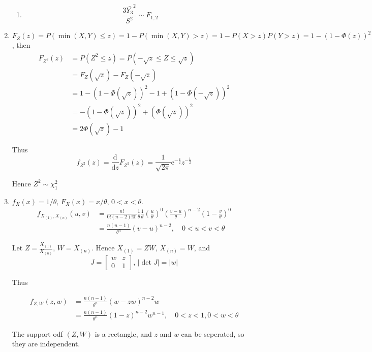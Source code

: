 \documentclass{article}
\begin{document}
\begin{enumerate}[leftmargin = 0 em, label = \arabic*., font = \bfseries]
\begin{enumerate}
		\item 
		\[\frac{3 \bar{Y_3}^2}{S^2} \sim F_{1,2}\]
	\end{enumerate}
	
	\item 
	$F_Z (z) = P(\min (X,Y) \leq z) = 1 - P(\min (X,Y) > z) = 1 - P(X>z)P(Y>z) = 1 - (1 - \Phi(z))^2$, then
	\begin{align*}
	F_{Z^2} (z) &= P(Z^2 \leq z)  = P(- \sqrt{z} \leq Z \leq \sqrt{z})\\
	& = F_{Z} (\sqrt{z}) - F_Z (-\sqrt{z})\\
	& = 1-(1 - \Phi(\sqrt{z}))^2 -1 + (1 - \Phi(-\sqrt{z}))^2\\
	& = -(1 - \Phi(\sqrt{z}))^2 + (\Phi (\sqrt{z}))^2\\
	& = 2 \Phi(\sqrt{z}) - 1
 	\end{align*}

 	Thus
 	\[f_{Z^2}(z) = \frac{\mathrm{d}}{\mathrm{d}z}F_{Z^2}(z) = \frac{1}{\sqrt{2 \pi}} \mathrm{e}^{-\frac{z}{2}} z^{-\frac{1}{2}}\]

 	Hence $Z^2 \sim \chi^2_{1}$


 	\item 
 	$f_X (x) = 1/\theta,\, F_X (x) = x/\theta,\, 0< x < \theta$.
 	\begin{align*}
 	f_{X_{(1)}, X_{(n)}}(u,v) & = \frac{n!}{0!(n-2)!0!} \frac{1}{\theta} \frac{1}{\theta} (\frac{u}{\theta})^0 (\frac{v - u}{\theta})^{n-2}(1 - \frac{v}{\theta})^0\\
 	& = \frac{n(n-1)}{\theta^n} (v - u)^{n-2},\quad 0< u< v <\theta
 	\end{align*}

 	Let $Z = \frac{X_{(1)}}{X_{(n)}},\, W = X_{(n)}$. Hence $X_{(1)} = ZW,\, X_{(n)} = W$, and
 	\[J = \begin{bmatrix}
 		w & z\\
 		0 & 1
 	\end{bmatrix},\, |\det J| = |w|\]

 	Thus

 	\begin{align*}
 	f_{Z,W} (z,w) & = \frac{n(n-1)}{\theta^n} (w - zw)^{n-2} w\\
 	& = \frac{n(n-1)}{\theta^n} (1 - z)^{n-2} w^{n-1},\quad 0<z<1, 0< w < \theta
 	\end{align*}

 	The support odf $(Z,W)$ is a rectangle, and $z$ and $w$ can be seperated, so they are independent.



\end{enumerate}
\end{document}

